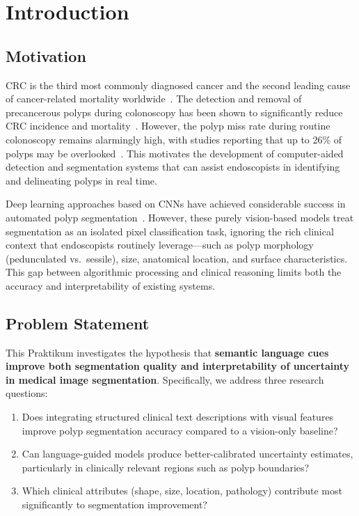 
\chapter{Introduction}
\label{ch:introduction}

\section{Motivation}
\label{sec:intro:motivation}

\ac{CRC} is the third most commonly diagnosed cancer and the second leading cause of cancer-related mortality worldwide~\cite{sung2021global}. The detection and removal of precancerous polyps during colonoscopy has been shown to significantly reduce \ac{CRC} incidence and mortality~\cite{zauber2012colonoscopic}. However, the polyp miss rate during routine colonoscopy remains alarmingly high, with studies reporting that up to 26\% of polyps may be overlooked~\cite{kim2017miss}. This motivates the development of computer-aided detection and segmentation systems that can assist endoscopists in identifying and delineating polyps in real time.

Deep learning approaches based on \acp{CNN} have achieved considerable success in automated polyp segmentation~\cite{fan2020pranet, jha2020doubleunet, zhou2018unetplusplus}. However, these purely vision-based models treat segmentation as an isolated pixel classification task, ignoring the rich clinical context that endoscopists routinely leverage---such as polyp morphology (pedunculated vs.\ sessile), size, anatomical location, and surface characteristics. This gap between algorithmic processing and clinical reasoning limits both the accuracy and interpretability of existing systems.

\section{Problem Statement}
\label{sec:intro:problem}

This Praktikum investigates the hypothesis that \textbf{semantic language cues improve both segmentation quality and interpretability of uncertainty in medical image segmentation}. Specifically, we address three research questions:

\begin{enumerate}
	\item Does integrating structured clinical text descriptions with visual features improve polyp segmentation accuracy compared to a vision-only baseline?
	\item Can language-guided models produce better-calibrated uncertainty estimates, particularly in clinically relevant regions such as polyp boundaries?
	\item Which clinical attributes (shape, size, location, pathology) contribute most significantly to segmentation improvement?
\end{enumerate}


